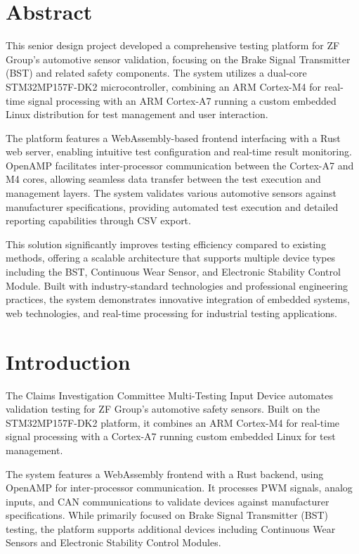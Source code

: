 \documentclass[12pt]{article}
\begin{document}
\section{Abstract}


This senior design project developed a comprehensive testing platform for ZF Group's 
automotive sensor validation, focusing on the Brake Signal Transmitter (BST) and 
related safety components. The system utilizes a dual-core STM32MP157F-DK2 
microcontroller, combining an ARM Cortex-M4 for real-time signal processing with 
an ARM Cortex-A7 running a custom embedded Linux distribution for test management 
and user interaction.

The platform features a WebAssembly-based frontend interfacing with a Rust web 
server, enabling intuitive test configuration and real-time result monitoring. 
OpenAMP facilitates inter-processor communication between the Cortex-A7 and M4 
cores, allowing seamless data transfer between the test execution and management 
layers. The system validates various automotive sensors against manufacturer 
specifications, providing automated test execution and detailed reporting 
capabilities through CSV export.

This solution significantly improves testing efficiency compared to existing methods, 
offering a scalable architecture that supports multiple device types including the 
BST, Continuous Wear Sensor, and Electronic Stability Control Module. Built with 
industry-standard technologies and professional engineering practices, the system 
demonstrates innovative integration of embedded systems, web technologies, and 
real-time processing for industrial testing applications.

\section{Introduction}
The Claims Investigation Committee Multi-Testing Input Device automates validation 
testing for ZF Group's automotive safety sensors. Built on the STM32MP157F-DK2 
platform, it combines an ARM Cortex-M4 for real-time signal processing with a 
Cortex-A7 running custom embedded Linux for test management.

The system features a WebAssembly frontend with a Rust backend, using OpenAMP for 
inter-processor communication. It processes PWM signals, analog inputs, and CAN 
communications to validate devices against manufacturer specifications. While 
primarily focused on Brake Signal Transmitter (BST) testing, the platform supports 
additional devices including Continuous Wear Sensors and Electronic Stability 
Control Modules.
\end{document}
